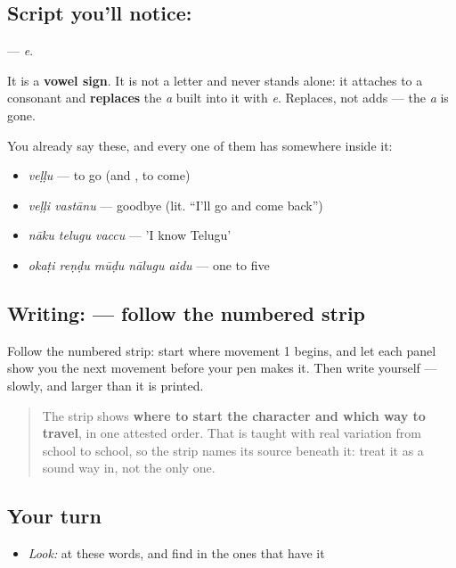\subsection*{Script you'll notice: }
\textbf{} — \emph{e}.

It is a \textbf{vowel sign}. It is not a letter and never stands alone: it attaches to a consonant and \textbf{replaces} the \emph{a} built into it with \emph{e}. Replaces, not adds — the \emph{a} is gone.

You already say these, and every one of them has  somewhere inside it:

\begin{itemize}
\raggedright
  \item \textbf{} \emph{veḷḷu} — to go (and , to come)
  \item \textbf{ } \emph{veḷḷi vastānu} — goodbye (lit. \textquotedblleft{}I'll go and come back\textquotedblright{})
  \item \textbf{  } \emph{nāku telugu vaccu} — 'I know Telugu'
  \item \textbf{    } \emph{okaṭi reṇḍu mūḍu nālugu aidu} — one to five
\end{itemize}

\subsection*{Writing:  — follow the numbered strip}

Follow the numbered strip: start where movement 1 begins, and let each panel show you the next movement before your pen makes it. Then write  yourself — slowly, and larger than it is printed.

\begin{quote}
The strip shows \textbf{where to start the character and which way to travel}, in one attested order. That is taught with real variation from school to school, so the strip names its source beneath it: treat it as a sound way in, not the only one.
\end{quote}

\subsection*{Your turn}
\begin{itemize}
\raggedright
  \item \emph{Look:} at these words, and find  in the ones that have it
\end{itemize}

